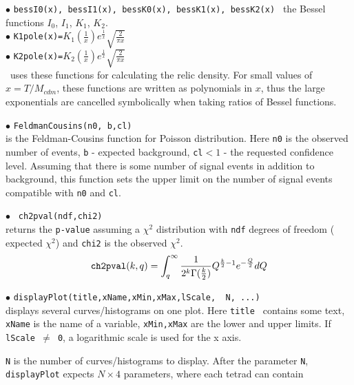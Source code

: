 \documentclass[12pt,a4paper]{article}
\begin{document}
\noindent$\bullet$ \verb|bessI0(x), bessI1(x), bessK0(x), bessK1(x), bessK2(x) |
 the Bessel functions $I_0$, $I_1$, $K_1$, $K_2$.\\ 

\noindent$\bullet$ \verb|K1pole(x)=|$K_1(\frac{1}{x}) e^\frac{1}{x}
\sqrt{\frac{2}{\pi x}}$  \\
\noindent$\bullet$ \verb|K2pole(x)=|$K_2(\frac{1}{x}) e^\frac{1}{x}
\sqrt{\frac{2}{\pi x}}$   \\
\micro\ uses these functions for calculating the  relic density. For 
small values of $x=T/M_{cdm}$, these functions are written as polynomials in $x$, thus the large exponentials are cancelled symbolically when taking ratios 
 of  Bessel functions.  


\noindent$\bullet$ \verb|FeldmanCousins(n0, b,cl)|\\
is the Feldman-Cousins \cite{Feldman:1997qc}  function for Poisson distribution.
Here {\tt n0} is the observed number of events, {\tt b} -  expected background,
\verb|cl|$ < 1 $ - the requested confidence level. Assuming that  
there is some number of signal events in addition to background, this function sets the upper limit on the number 
of signal events compatible with {\tt n0}  and {\tt cl}.

\noindent$\bullet$ \verb| ch2pval(ndf,chi2)|\\ 
returns the {\tt p-value} assuming a $\chi^2$ distribution with  {\tt ndf} degrees
of freedom ( expected  $\chi^2$) and {\tt chi2} is the observed $\chi^2$.  
$$   
{  \verb|ch2pval|(k,q)=\int_q^\infty  \frac{1}{2^k \Gamma(\frac{k}{2})} Q^{\frac{k}{2}-1}
e^{-\frac{Q}{2}} dQ } $$   

\noindent$\bullet$ \verb|displayPlot(title,xName,xMin,xMax,lScale,  N, ...)|\\
displays several  curves/histograms on one plot.  Here {\tt title  } contains some text, {\tt xName} is the name of a variable, 
{\tt xMin,xMax} are the lower and upper limits. If {\tt lScale $\neq$ 0}, a logarithmic scale 
is used for the x axis.


{\tt N} is the number of
curves/histograms  to display. 
 After the parameter {\tt N}, {\tt displayPlot} expects $N\times 4$ parameters, 
where each tetrad can  contain \\
\end{document}
